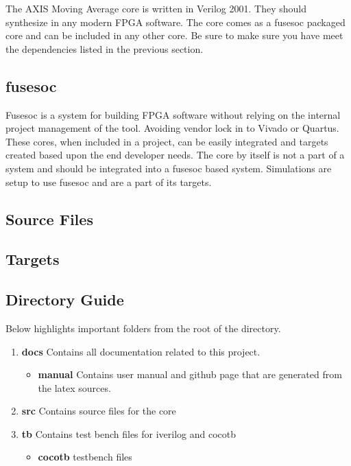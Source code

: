 \par
The AXIS Moving Average core is written in Verilog 2001. They should synthesize in any modern FPGA software. The core comes as a fusesoc packaged core and can be
included in any other core. Be sure to make sure you have meet the dependencies listed in the previous section.

\subsection{fusesoc}
\par
Fusesoc is a system for building FPGA software without relying on the internal project management of the tool. Avoiding vendor lock in to Vivado or Quartus.
These cores, when included in a project, can be easily integrated and targets created based upon the end developer needs. The core by itself is not a part of
a system and should be integrated into a fusesoc based system. Simulations are setup to use fusesoc and are a part of its targets.

\subsection{Source Files}



\subsection{Targets}



\subsection{Directory Guide}

\par
Below highlights important folders from the root of the directory.

\begin{enumerate}
  \item \textbf{docs} Contains all documentation related to this project.
    \begin{itemize}
      \item \textbf{manual} Contains user manual and github page that are generated from the latex sources.
    \end{itemize}
  \item \textbf{src} Contains source files for the core
  \item \textbf{tb} Contains test bench files for iverilog and cocotb
    \begin{itemize}
      \item \textbf{cocotb} testbench files
    \end{itemize}
\end{enumerate}

